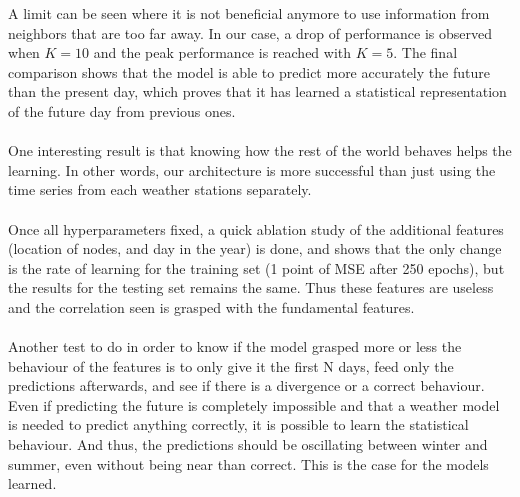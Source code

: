 \documentclass[11pt]{report}
\begin{document}
A limit can be seen where it is not beneficial anymore to use information from neighbors that are too far away. In our case, a drop of performance is observed when $K=10$ and the peak performance is reached with $K=5$. The final comparison shows that the model is able to predict more accurately the future than the present day, which proves that it has learned a statistical representation of the future day from previous ones.


\paragraph*{}
One interesting result is that knowing how the rest of the world behaves helps the learning. In other words, our architecture is more successful than just using the time series from each weather stations separately.

\paragraph*{}
Once all hyperparameters fixed, a quick ablation study of the additional features (location of nodes, and day in the year) is done, and shows that the only change is the rate of learning for the training set (1 point of MSE after 250 epochs), but the results for the testing set remains the same. Thus these features are useless and the correlation seen is grasped with the fundamental features.

\paragraph*{}
Another test to do in order to know if the model grasped more or less the behaviour of the features is to only give it the first N days, feed only the predictions afterwards, and see if there is a divergence or a correct behaviour. Even if predicting the future is completely impossible and that a weather model is needed to predict anything correctly, it is possible to learn the statistical behaviour. And thus, the predictions should be oscillating between winter and summer, even without being near than correct. This is the case for the models learned.
\end{document}
